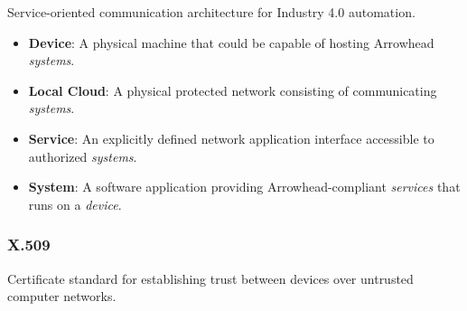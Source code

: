 Service-oriented communication architecture for Industry 4.0 automation.

\begin{itemize}
\item \textbf{Device}: A physical machine that could be capable of hosting Arrowhead \textit{systems}.
\item \textbf{Local Cloud}: A physical protected network consisting of communicating \textit{systems}.
\item \textbf{Service}: An explicitly defined network application interface accessible to authorized \textit{systems}.
\item \textbf{System}: A software application providing Arrowhead-compliant \textit{services} that runs on a \textit{device}.
\end{itemize}

\subsubsection{X.509}

Certificate standard for establishing trust between devices over untrusted computer networks.

